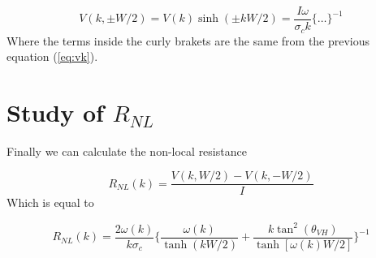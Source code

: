 \begin{equation}
    V(k,\pm W/2)=V(k)\sinh(\pm kW/2)=\frac{I\omega}{\sigma_c k}\bigg\{\dots\bigg\}^{-1}
\end{equation}
Where the terms inside the curly brakets are the same from the previous equation (\ref{eq:vk}).



\section{Study of $R_{NL}$}
Finally we can calculate the non-local resistance

\begin{equation}
    R_{NL}(k)=\frac{V(k,W/2)-V(k,-W/2)}I
\end{equation}
Which is equal to

\begin{equation}
    R_{NL}(k)=\frac{2\omega(k)}{k\sigma_c}
    \bigg\{
        \frac{\omega(k)}{\tanh(kW/2)} + \frac{k\tan^2(\theta_{VH})}{\tanh[\omega(k)W/2]}    
    \bigg\}^{-1}
\end{equation}